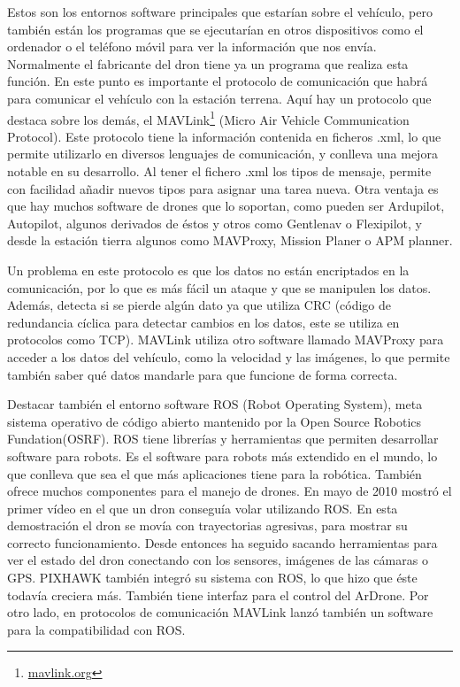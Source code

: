 Estos son los entornos software principales que estarían sobre el vehículo, pero también están los programas que se ejecutarían en otros dispositivos como el ordenador o el teléfono móvil para ver la información que nos envía. Normalmente el fabricante del dron tiene ya un programa que realiza esta función. En este punto es importante el protocolo de comunicación que habrá para comunicar el vehículo con la estación terrena. Aquí hay un protocolo que destaca sobre los demás, el MAVLink\footnote{\url{mavlink.org}} (Micro Air Vehicle Communication Protocol). Este protocolo tiene la información contenida en ficheros .xml, lo que permite utilizarlo en diversos lenguajes de comunicación, y conlleva una mejora notable en su desarrollo. Al tener el fichero .xml los tipos de mensaje, permite con facilidad añadir nuevos tipos para asignar una tarea nueva. Otra ventaja es que hay muchos software de drones que lo soportan, como pueden ser Ardupilot, Autopilot, algunos derivados de éstos y otros como Gentlenav o Flexipilot, y desde la estación tierra algunos como MAVProxy, Mission Planer o APM planner. 

Un problema en este protocolo es que los datos no están encriptados en la comunicación, por lo que es más fácil un ataque y que se manipulen los datos. Además, detecta si se pierde algún dato ya que utiliza CRC (código de redundancia cíclica para detectar cambios en los datos, este se utiliza en protocolos como TCP). MAVLink utiliza otro software llamado MAVProxy para acceder a los datos del vehículo, como la velocidad y las imágenes, lo que permite también saber qué datos mandarle para que funcione de forma correcta. 

Destacar también el entorno software ROS (Robot Operating System), meta sistema operativo de código abierto mantenido por la Open Source Robotics Fundation(OSRF). ROS tiene librerías y herramientas que permiten desarrollar software para robots. Es el software para robots más extendido en el mundo, lo que conlleva que sea el que más aplicaciones tiene para la robótica. También ofrece muchos componentes para el manejo de drones. En mayo de 2010 mostró el primer vídeo en el que un dron conseguía volar utilizando ROS. En esta demostración el dron se movía con trayectorias agresivas, para mostrar su correcto funcionamiento. Desde entonces ha seguido sacando herramientas para ver el estado del dron conectando con los sensores, imágenes de las cámaras o GPS. PIXHAWK también integró su sistema con ROS, lo que hizo que éste todavía creciera más. También tiene interfaz para el control del ArDrone. Por otro lado, en protocolos de comunicación MAVLink lanzó también un software para la compatibilidad con ROS. 


